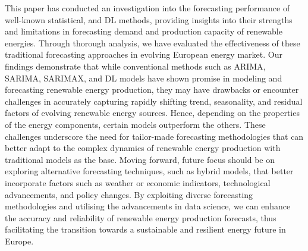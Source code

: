 \documentclass[acmtog]{acmart}
\begin{document}
This paper has conducted an investigation into the forecasting performance of well-known statistical, and DL methods, providing insights into their strengths and limitations in forecasting demand and production capacity of renewable energies. Through thorough analysis, we have evaluated the effectiveness of these traditional forecasting approaches in evolving European energy market. Our findings demonstrate that while conventional methods such as ARIMA, SARIMA, SARIMAX, and DL models have shown promise in modeling and forecasting renewable energy production, they may have drawbacks or encounter challenges in accurately capturing rapidly shifting trend, seasonality, and residual factors of evolving renewable energy sources. Hence, depending on the properties of the energy components, certain models outperform the others. These challenges underscore the need for tailor-made forecasting methodologies that can better adapt to the complex dynamics of renewable energy production with traditional models as the base. Moving forward, future focus should be on exploring alternative forecasting techniques, such as hybrid models, that better incorporate factors such as weather or economic indicators, technological advancements, and policy changes. By exploiting diverse forecasting methodologies and utilising the advancements in data science, we can enhance the accuracy and reliability of renewable energy production forecasts, thus facilitating the transition towards a sustainable and resilient energy future in Europe.




\end{document}
